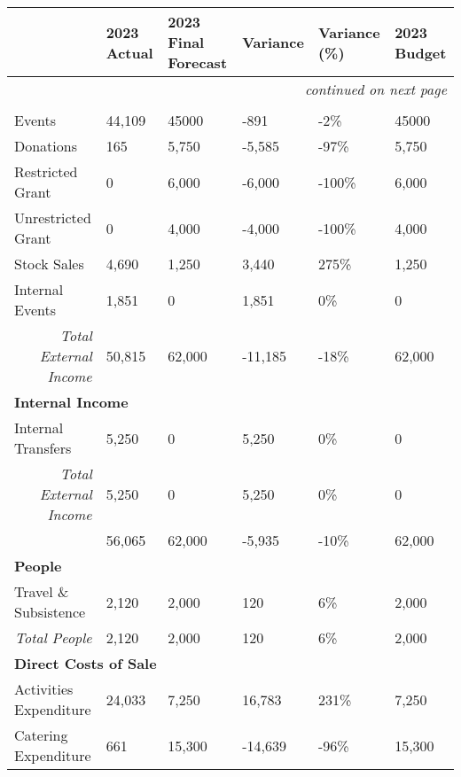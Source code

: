 {\RaggedRight \centering
    \begin{longtable}{p{} p{} p{} p{} p{} p{}}
    \textbf{} & \textbf{2023 Actual} & \textbf{2023 Final Forecast} & \textbf{Variance} & \textbf{Variance (\%)} & \textbf{2023 Budget}\\
    \hline
    \hline
    \endhead

    \multicolumn{6}{r}{\footnotesize\itshape continued on next page}\\
    \endfoot 

    \endlastfoot

    \multicolumn{6}{l}{\textbf{External Income}}\\*
    Events & 44,109 & 45000 & -891 & -2\% & 45000\\*
    Donations & 165 & 5,750 & -5,585 & -97\% & 5,750 \\*
    Restricted Grant & 0 & 6,000 & -6,000 & -100\% & 6,000 \\*
    Unrestricted Grant & 0 & 4,000 & -4,000 & -100\% & 4,000 \\*
    Stock Sales & 4,690 & 1,250 & 3,440 & 275\% & 1,250 \\*
    Internal Events & 1,851 & 0 & 1,851 & 0\% & 0\\*
    \multicolumn{1}{r}{\textit{Total External Income}} & 50,815 & 62,000 & -11,185 & -18\% & 62,000\\
    \hline
    \multicolumn{6}{l}{\textbf{Internal Income}}\\*
    Internal Transfers & 5,250 & 0 & 5,250 & 0\% & 0\\*
    \multicolumn{1}{r}{\textit{Total External Income}}& 5,250 & 0 & 5,250 & 0\% & 0\\*
    \hline
    \rowcolor{accent!60}
    \multicolumn{1}{r}{\textit{Total Income}}& 56,065 & 62,000 & -5,935 & -10\% & 62,000\\
    \hline
    \multicolumn{6}{l}{\textbf{People}}\\*
    Travel \& Subsistence & 2,120 & 2,000 & 120 & 6\% & 2,000\\*
    \multicolumn{1}{r}{\textit{Total People}} & 2,120 & 2,000 & 120 & 6\% & 2,000\\*
    \hline
    \multicolumn{6}{l}{\textbf{Direct Costs of Sale}}\\*
    Activities Expenditure & 24,033 & 7,250 & 16,783 & 231\% & 7,250 \\*
    Catering Expenditure & 661 & 15,300 & -14,639 & -96\% & 15,300 \\*

\end{longtable}}
